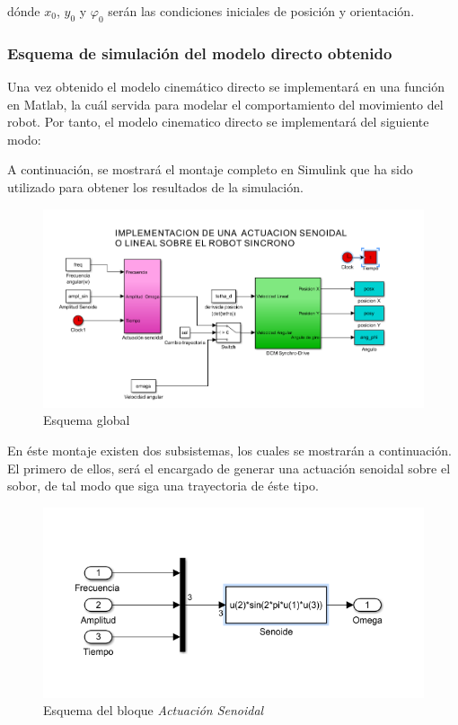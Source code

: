 \documentclass[a4paper,twoside]{article}
\begin{document}
	dónde $x_0$, $y_0$ y $\varphi_0$ serán las condiciones iniciales de posición y orientación.\\
	\subsubsection{Esquema de simulación del modelo directo obtenido}
	Una vez obtenido el modelo cinemático directo se implementará en una función en Matlab, la cuál servida para modelar el comportamiento del movimiento del robot. Por tanto, el modelo cinematico directo se implementará del siguiente modo:
	

	A continuación, se mostrará el montaje completo en Simulink que ha sido utilizado para obtener los resultados de la simulación.
	\begin{figure}[h!]
		\centering
		\includegraphics[width=.8\textwidth]{simulink_MCD_1}
		\caption{Esquema global}
	\end{figure}

En éste montaje existen dos subsistemas, los cuales se mostrarán a continuación. El primero de ellos, será el encargado de generar una actuación senoidal sobre el sobor, de tal modo que siga una trayectoria de éste tipo.
\begin{figure}[h!]
	\centering
	\includegraphics[width=.5\textwidth]{simulink_MCD_2}
	\caption{Esquema del bloque \textit{Actuación Senoidal}}
\end{figure}
\end{document}
